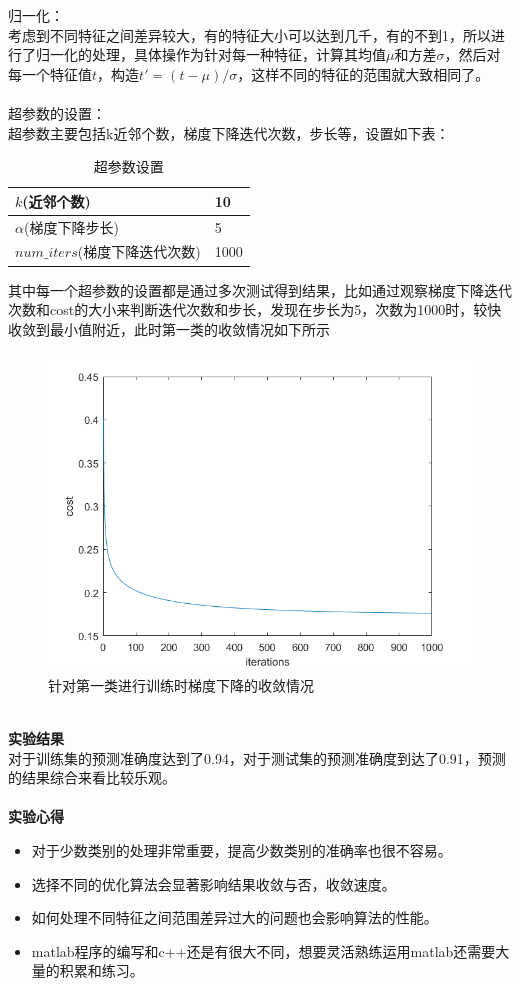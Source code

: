 \documentclass[a4paper,UTF8]{article}
\numberwithin{equation}{section}
\begin{document}
归一化：\\
考虑到不同特征之间差异较大，有的特征大小可以达到几千，有的不到1，所以进行了归一化的处理，具体操作为针对每一种特征，计算其均值$\mu$和方差$\sigma$，然后对每一个特征值$t$，构造$t' = (t-\mu)/\sigma$，这样不同的特征的范围就大致相同了。\\\\
超参数的设置：\\
超参数主要包括k近邻个数，梯度下降迭代次数，步长等，设置如下表：
\begin{table}[!htbp]
	\centering
	\caption{超参数设置}
	\label{my-label}
	\begin{tabular}{|l|l|}
		\hline
		$k$(近邻个数)          & 10    \\ \hline
		$\alpha$(梯度下降步长)     & 5    \\ \hline
		$num\_iters$(梯度下降迭代次数) & 1000 \\ \hline
	\end{tabular}
\end{table}
其中每一个超参数的设置都是通过多次测试得到结果，比如通过观察梯度下降迭代次数和cost的大小来判断迭代次数和步长，发现在步长为5，次数为1000时，较快收敛到最小值附近，此时第一类的收敛情况如下所示
\begin{figure}[ht]
	\centering
	\includegraphics[scale=0.5]{cost.png}
	\caption{针对第一类进行训练时梯度下降的收敛情况}
	\label{fig:label}
\end{figure}\\
\noindent\textbf{实验结果}\\
对于训练集的预测准确度达到了0.94，对于测试集的预测准确度到达了0.91，预测的结果综合来看比较乐观。\\\\

\noindent\textbf{实验心得}\\
\begin{itemize}
\item 对于少数类别的处理非常重要，提高少数类别的准确率也很不容易。
\item 选择不同的优化算法会显著影响结果收敛与否，收敛速度。 
\item 如何处理不同特征之间范围差异过大的问题也会影响算法的性能。
\item matlab程序的编写和c++还是有很大不同，想要灵活熟练运用matlab还需要大量的积累和练习。
\end{itemize}
\end{document}

